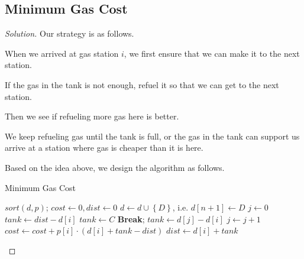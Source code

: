 \documentclass{article}
\newcommand{\set}[1]{\left\{#1\right\}}
\newenvironment{solution}{\begin{proof}[\noindent\it Solution]}{\end{proof}}
\begin{document}
\subsection{Minimum Gas Cost}
\vspace{1em}
\begin{solution}
    Our strategy is as follows. 
    
    \hspace{2.6em}
    When we arrived at gas station $i$, we first ensure that we can make it to the next station. 
    
    \hspace{2.6em}
    If the gas in the tank is not enough, refuel it so that we can get to the next station.
    
    \hspace{2.6em}
    Then we see if refueling more gas here is better.
    
    \hspace{2.6em}
    We keep refueling gas until the tank is full, or the gas in the tank can support us arrive at a station where gas is cheaper than it is here.  
    
    \vspace{2em} \hspace{2.6em}
    Based on the idea above, we design the algorithm as follows.
    
    \begin{algorithm}
        \caption{Minimum Gas Cost}
        
	    {
	        $sort(d,p)$;\qquad\qquad\qquad\qquad\qquad\qquad\qquad\qquad{}
	        $cost\gets 0, dist\gets 0$\;
	        $d\gets d\cup\set{D}$, i.e. $d[n+1]\gets D$\;
	        $j \gets 0$\;
	        {
	            $tank\gets dist-d[i]$\;
	            {
	                {
	                    $tank\gets C$\;
	                    \textbf{Break};
	                }
	                $tank\gets d[j]-d[i]$\;
	                $j\gets j+1$\;
	            }
	            $cost\gets cost+p[i]\cdot(d[i]+tank-dist)$\;
	            $dist\gets d[i]+tank$\;
	        }
	   }
    \end{algorithm}
    

\end{solution}
\end{document}
